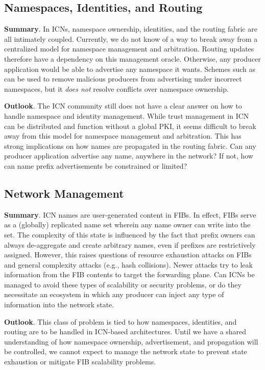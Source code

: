 \subsection{Namespaces, Identities, and Routing}
{\bf Summary}. In ICNs, namespace ownership, identities, and
the routing fabric are all intimately coupled. Currently, we do not know of a way
to break away from a centralized model for namespace management and arbitration.
Routing updates therefore have a dependency on this management oracle. Otherwise,
any producer application would be able to advertise any namespace it wants. Schemes
such as \cite{dibenedetto2015mitigating} can be used to remove malicious producers
from advertising under incorrect namespaces, but it \emph{does not} resolve conflicts
over namespace ownership.

{\bf Outlook}. The ICN community still does not have a clear answer on how to handle
namespace and identity management. While trust management in ICN can be distributed and
function without a global PKI, it seems difficult to break away from this model for
namespace management and arbitration. This has strong implications on how names are
propagated in the routing fabric. Can any producer application advertise any name,
anywhere in the network? If not, how can name prefix advertisements be constrained or limited?

\subsection{Network Management}
{\bf Summary}. ICN names are user-generated content in FIBs. In effect, FIBs serve as a (globally)
replicated name set wherein any name owner can write into the set. The complexity of
this state is influenced by the fact that prefix owners can always de-aggregate and
create arbitrary names, even if prefixes are restrictively assigned. However, this
raises questions of resource exhaustion attacks on FIBs and general complexity
attacks (e.g., hash collisions). Newer attacks try to leak information from the
FIB contents to target the forwarding plane. Can ICNs be managed to avoid these
types of scalability or security problems, or do they necessitate an ecosystem in
which any producer can inject any type of information into the network state.

{\bf Outlook}. This class of problem is tied to how namespaces, identities, and routing
are to be handled in ICN-based architectures. Until we have a shared understanding
of how namespace ownership, advertisement, and propagation will be controlled, we
cannot expect to manage the network state to prevent state exhaustion or mitigate
FIB scalability problems.

